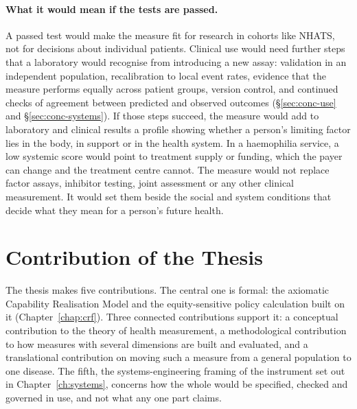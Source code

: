 \paragraph{What it would mean if the tests are passed.} A passed test would make
the measure fit for research in cohorts like NHATS, not for decisions about
individual patients. Clinical use would need further steps that a laboratory
would recognise from introducing a new assay: validation in an independent
population, recalibration to local event rates, evidence that the measure
performs equally across patient groups, version control, and continued checks of
agreement between predicted and observed outcomes (\S\ref{sec:conc-use} and
\S\ref{sec:conc-systems}). If those steps succeed, the measure would add to
laboratory and clinical results a profile showing whether a person's limiting
factor lies in the body, in support or in the health system. In a haemophilia
service, a low systemic score would point to treatment supply or funding, which
the payer can change and the treatment centre cannot. The measure would not
replace factor assays, inhibitor testing, joint assessment or any other clinical
measurement. It would set them beside the social and system conditions that
decide what they mean for a person's future health.

\section{Contribution of the Thesis}
\label{sec:contribution}

\noindent The thesis makes five contributions. The central one is formal: the axiomatic Capability Realisation Model and the equity-sensitive policy calculation built on it (Chapter~\ref{chap:crf}). Three connected contributions support it: a conceptual contribution to the theory of health measurement, a methodological contribution to how measures with several dimensions are built and evaluated, and a translational contribution on moving such a measure from a general population to one disease. The fifth, the systems-engineering framing of the instrument set out in Chapter~\ref{ch:systems}, concerns how the whole would be specified, checked and governed in use, and not what any one part claims.


